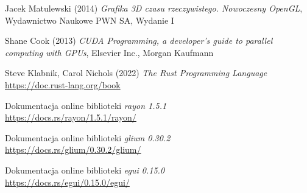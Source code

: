 \documentclass[12pt, letterpaper]{report}
\begin{document}
    \begin{thebibliography}{9}
        Jacek Matulewski (2014) 
        \emph{Grafika 3D czasu rzeczywistego. Nowoczesny OpenGL}, 
        Wydawnictwo Naukowe PWN SA, Wydanie I

        Shane Cook (2013) 
        \emph{CUDA Programming, a developer's guide to parallel computing with GPUs}, 
        Elsevier Inc., Morgan Kaufmann

        Steve Klabnik, Carol Nichols (2022)
        \emph{The Rust Programming Language} \\
        \url{https://doc.rust-lang.org/book}

        Dokumentacja online biblioteki \emph{rayon 1.5.1} \\
        \url{https://docs.rs/rayon/1.5.1/rayon/}

        Dokumentacja online biblioteki \emph{glium 0.30.2} \\
        \url{https://docs.rs/glium/0.30.2/glium/}

        Dokumentacja online biblioteki \emph{egui 0.15.0} \\
        \url{https://docs.rs/egui/0.15.0/egui/}

    \end{thebibliography}
\end{document}
